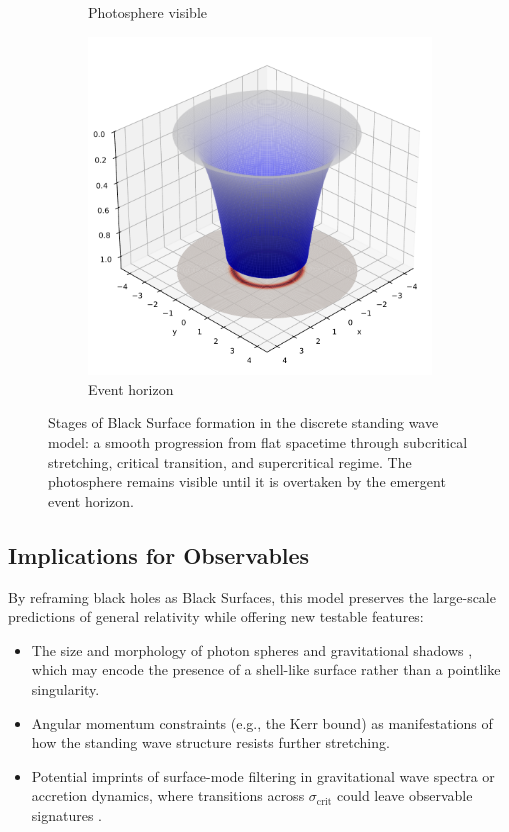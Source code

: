 \documentclass[12pt]{article}
\begin{document}
\begin{figure}[H]
\begin{subfigure}[b]{0.3\textwidth}
    \caption{Photosphere visible}
  \end{subfigure}
  \hfill
  \begin{subfigure}[b]{0.3\textwidth}
    \includegraphics[width=\textwidth]{frame_170_event_horizon.pdf}
    \caption{Event horizon}
  \end{subfigure}

  \caption{Stages of Black Surface formation in the discrete standing wave model: a smooth progression from flat spacetime through subcritical stretching, critical transition, and supercritical regime. The photosphere remains visible until it is overtaken by the emergent event horizon.}
  \label{fig:black_surface_stages}
\end{figure}

\subsection{Implications for Observables}

By reframing black holes as Black Surfaces, this model preserves the large-scale predictions of general relativity while offering new testable features:
\begin{itemize}
    \item The size and morphology of photon spheres and gravitational shadows \cite{eventhorizon2019}, which may encode the presence of a shell-like surface rather than a pointlike singularity.
    \item Angular momentum constraints (e.g., the Kerr bound) as manifestations of how the standing wave structure resists further stretching.
    \item Potential imprints of surface-mode filtering in gravitational wave spectra or accretion dynamics, where transitions across $\sigma_{\text{crit}}$ could leave observable signatures \cite{abbott2016, cardoso2016}.
\end{itemize}
\end{document}
